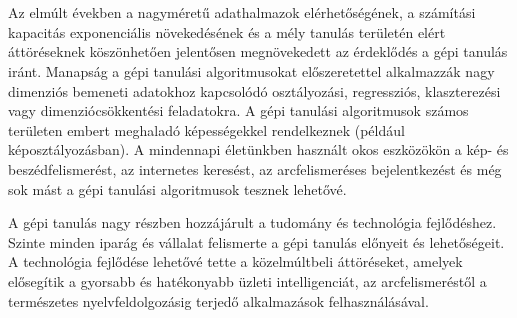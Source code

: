 \section{\bevezetes}


Az elmúlt években a nagyméretű adathalmazok elérhetőségének, a számítási kapacitás exponenciális növekedésének és a mély tanulás területén elért áttöréseknek köszönhetően jelentősen megnövekedett az érdeklődés a gépi tanulás iránt. Manapság a gépi tanulási algoritmusokat előszeretettel alkalmazzák nagy dimenziós bemeneti adatokhoz kapcsolódó osztályozási, regressziós, klaszterezési vagy dimenziócsökkentési feladatokra. A gépi tanulási algoritmusok számos területen embert meghaladó képességekkel rendelkeznek (például képosztályozásban). A mindennapi életünkben használt okos eszközökön a kép- és beszédfelismerést, az internetes keresést, az arcfelismeréses bejelentkezést és még sok mást a gépi tanulási algoritmusok tesznek lehetővé.


A gépi tanulás nagy részben hozzájárult a tudomány és technológia fejlődéshez. Szinte minden iparág és vállalat felismerte a gépi tanulás előnyeit és lehetőségeit. A technológia fejlődése lehetővé tette a közelmúltbeli áttöréseket, amelyek elősegítik a gyorsabb és hatékonyabb üzleti intelligenciát, az arcfelismeréstől a természetes nyelvfeldolgozásig terjedő alkalmazások felhasználásával.


